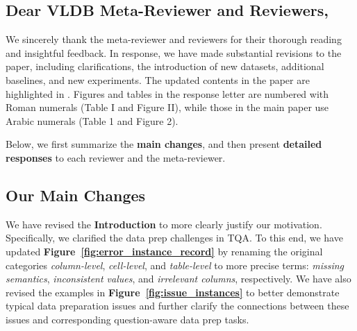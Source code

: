 \subsection*{Dear VLDB Meta-Reviewer and Reviewers,}

\noindent 
We sincerely thank the meta-reviewer and reviewers for their thorough reading and insightful feedback. 
In response, we have made substantial revisions to the paper, including clarifications, the introduction of new datasets, additional baselines, and new experiments.
The updated contents in the paper are highlighted in .
Figures and tables in the response letter are numbered with Roman numerals (\eg Table I and Figure II), while those in the main paper use Arabic numerals (\eg Table 1 and Figure 2).



Below, we first summarize the \textbf{main changes}, and then present \textbf{detailed responses} to each reviewer and the meta-reviewer.

\subsection*{Our Main Changes}

We have revised the \textbf{Introduction} to more clearly justify our motivation.
Specifically, we clarified the data prep challenges in TQA.
To this end, we have updated \textbf{Figure~\ref{fig:error_instance_record}} by renaming the original categories \emph{column-level}, \emph{cell-level}, and \emph{table-level} to more precise terms: \emph{missing semantics}, \emph{inconsistent values}, and \emph{irrelevant columns}, respectively.
We have also revised the examples in \textbf{Figure~\ref{fig:issue_instances}} to better demonstrate typical data preparation issues and further clarify the connections between these issues and corresponding question-aware data prep tasks.

